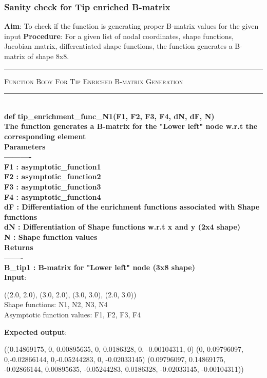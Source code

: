 \documentclass[fleqn, 12.5pt,a4paper]{report}
\begin{document}
\subsubsection{Sanity check for Tip enriched B-matrix}
\textbf{Aim}: To check if the function is generating proper B-matrix values for the given input\newline
\textbf{Procedure}: For a given list of nodal coordinates, shape functions, Jacobian matrix, differentiated shape functions, the function generates a B-matrix of shape 8x8.
\\
{ \rule{\linewidth}{0.05cm}}
	{\scshape Function Body For Tip Enriched B-matrix Generation}\\
{ \rule{\linewidth}{0.05cm}}
{\selectfont
\\
\textbf{def tip{\_}enrichment{\_}func{\_}N1(F1, F2, F3, F4, dN, dF, N)\\
    The function generates a B-matrix for the "Lower left" node w.r.t the\\ corresponding element\\
    Parameters\\
    ----------\\
    F1 : asymptotic{\_}function1\\
    F2 : asymptotic{\_}function2\\
    F3 : asymptotic{\_}function3\\
    F4 : asymptotic{\_}function4\\
    dF : Differentiation of the enrichment functions associated with Shape functions\\
    dN : Differentiation of Shape functions w.r.t x and y (2x4 shape)\\
    N : Shape function values\\
    Returns\\
    -------\\
    B{\_}tip1 : B-matrix for "Lower left" node (3x8 shape)\\
}}
\textbf{Input}:
\begin{center}
((2.0, 2.0), (3.0, 2.0), (3.0, 3.0), (2.0, 3.0))\\
Shape functions: N1, N2, N3, N4\\
Asymptotic function values: F1, F2, F3, F4

\end{center}
\textbf{Expected output}:
\begin{center}
((0.14869175,  0, 0.00895635,  0, 0.0186328, 0. -0.00104311,  0)\newline
 (0, 0.09796097,  0,-0.02866144,  0,-0.05244283, 0, -0.02033145)\newline
 (0.09796097, 0.14869175, -0.02866144, 0.00895635, -0.05244283, 0.0186328, -0.02033145, -0.00104311))
\end{center}
\end{document}

